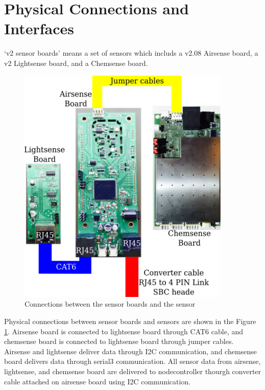 \section{Physical Connections and Interfaces}

`v2 sensor boards' means a set of sensors which includs a v2.08 Airsense board, a v2 Lightsense board, and a Chemsense board.

\begin{figure}[h]
\begin{center}
\includegraphics[width=4in]{g4353.png}
\caption{Connections between the sensor boards and the sensor}
\label{fig:physicalConnections}
\end{center}
\end{figure}

Physical connections between sensor boards and sensors are shown in the Figure \ref{fig:physicalConnections}. Airsense board is connected to lightsense board through CAT6 cable, and chemsense board is connected to lightsense board through jumper cables. Airsense and lightsense deliver data through I2C communication, and chemsense board delivers data through serial3 communication. All sensor data from airsense, lightsense, and chemsense board are delivered to nodecontroller thourgh converter cable attached on airsense board using I2C communication.